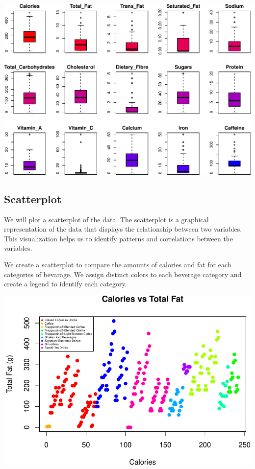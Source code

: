 \documentclass[
]{article}
\begin{document}
\begin{center}\includegraphics{Statistical_Learning_Final_Report_files/figure-latex/boxplot-1} \end{center}

\subsection{Scatterplot}\label{scatterplot}

We will plot a scatterplot of the data. The scatterplot is a graphical
representation of the data that displays the relationship between two
variables. This visualization helps us to identify patterns and
correlations between the variables.

We create a scatterplot to compare the amounts of calories and fat for
each categories of bevarage. We assign distinct colors to each beverage
category and create a legend to identify each category.

\begin{center}\includegraphics{Statistical_Learning_Final_Report_files/figure-latex/fat_comparison-1} \end{center}
\end{document}
